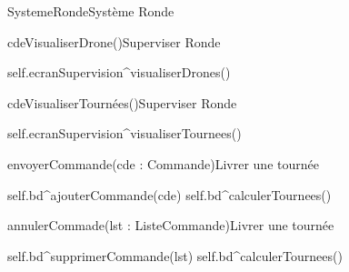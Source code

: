 \begin{OM}{SystemeRonde}{Système Ronde}
    \begin{OMOperation}{cdeVisualiserDrone()}{Superviser Ronde}{}
        \begin{OMMessages}
        \end{OMMessages}
        \OMNoPre
        \begin{OMPost}
            self.ecranSupervision^visualiserDrones()
        \end{OMPost}
    \end{OMOperation}

    \begin{OMOperation}{cdeVisualiserTournées()}{Superviser Ronde}{}
        \begin{OMMessages}
        \end{OMMessages}
        \OMNoPre
        \begin{OMPost}
            self.ecranSupervision^visualiserTournees()
        \end{OMPost}
    \end{OMOperation}

    \begin{OMOperation}{envoyerCommande(cde : Commande)}{Livrer une tournée}{}
        \begin{OMMessages}
        \end{OMMessages}
        \OMNoPre
        \begin{OMPost}
            self.bd^ajouterCommande(cde)
            self.bd^calculerTournees()
        \end{OMPost}
    \end{OMOperation}

    \begin{OMOperation}{annulerCommade(lst : ListeCommande)}{Livrer une tournée}{}
        \begin{OMMessages}
        \end{OMMessages}
        \OMNoPre
        \begin{OMPost}
            self.bd^supprimerCommande(lst)
            self.bd^calculerTournees()
        \end{OMPost}
    \end{OMOperation}


\end{OM}
